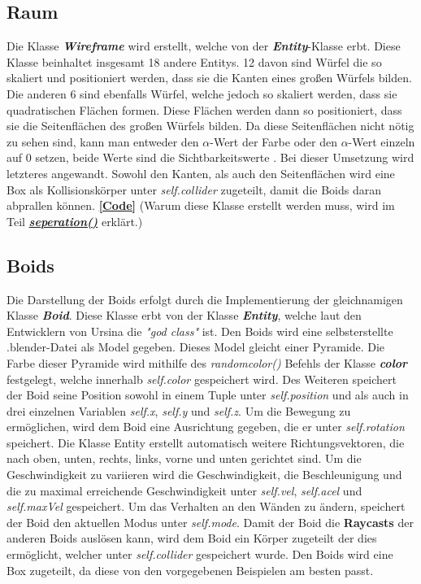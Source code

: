 \documentclass[a4paper, hidelinks, 12pt]{article}
\begin{document}
\subsection{Raum}\label{UmsetzungWireframe}
Die Klasse \textbf{\emph{Wireframe}} wird erstellt, welche von der \textbf{\emph{Entity}}-Klasse\cite{2022l} erbt. Diese Klasse beinhaltet insgesamt 18 andere Entitys. 12 davon sind Würfel die so skaliert und positioniert werden, dass sie die Kanten eines großen Würfels bilden. Die anderen 6 sind ebenfalls Würfel, welche jedoch so skaliert werden, dass sie quadratischen Flächen formen. Diese Flächen werden dann so positioniert, dass sie die Seitenflächen des großen Würfels bilden. Da diese Seitenflächen nicht nötig zu sehen sind, kann man entweder den $\alpha$-Wert der Farbe oder den $\alpha$-Wert einzeln auf 0 setzen, beide Werte sind die Sichtbarkeitswerte \cite{2022p}. Bei dieser Umsetzung wird letzteres angewandt. Sowohl den Kanten, als auch den Seitenflächen wird eine Box als Kollisionskörper unter \emph{self.collider} zugeteilt, damit die Boids daran abprallen können\cite{2022r}. \hyperref[CodeRaum]{\textbf{[Code]}} \newline\newline \scriptsize (Warum diese Klasse erstellt werden muss, wird im Teil \hyperref[Umsetzungseperation]{\textbf{\emph{seperation()}}} erklärt.)
\newpage
\normalsize\subsection{Boids}\label{UmsetzungBoid}
Die Darstellung der Boids erfolgt durch die Implementierung der gleichnamigen Klasse \textbf{\emph{Boid}}. Diese Klasse erbt von der Klasse \textbf{\emph{Entity}}\cite{2022l}, welche laut den Entwicklern von Ursina die \emph{"god class"} ist\cite{godclass}. 
Den Boids wird eine selbsterstellte .blender-Datei als Model gegeben. Dieses Model gleicht einer Pyramide. Die Farbe dieser Pyramide wird mithilfe des \emph{random\textunderscore color()} Befehls der Klasse \textbf{\emph{color}} festgelegt, welche innerhalb \emph{self.color} gespeichert wird\cite{color}. Des Weiteren speichert der Boid seine Position sowohl in einem Tuple unter \emph{self.position} und als auch in drei einzelnen Variablen \emph{self.x}, \emph{self.y} und \emph{self.z}. Um die Bewegung zu ermöglichen, wird dem Boid eine Ausrichtung gegeben, die er unter \emph{self.rotation} speichert\cite{2022l}. Die Klasse Entity erstellt automatisch weitere Richtungsvektoren, die nach oben, unten, rechts, links, vorne und unten gerichtet sind. Um die Geschwindigkeit zu variieren wird die Geschwindigkeit, die Beschleunigung und die zu maximal erreichende Geschwindigkeit unter \emph{self.vel}, \emph{self.acel} und \emph{self.maxVel} gespeichert. Um das Verhalten an den Wänden zu ändern, speichert der Boid den aktuellen Modus unter \emph{self.mode}. Damit der Boid die \textbf{Raycasts}\cite{raycast} der anderen Boids auslösen kann, wird dem Boid ein Körper zugeteilt der dies ermöglicht, welcher unter \emph{self.collider} gespeichert wurde. Den Boids wird eine Box zugeteilt, da diese von den vorgegebenen Beispielen am besten passt\cite{2022r}.
\end{document}

